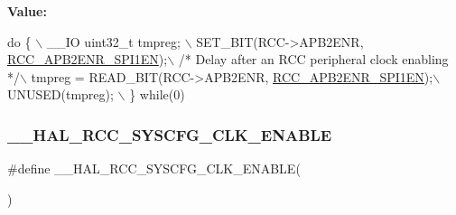 {\bfseries Value\+:}
\begin{DoxyCode}
\textcolor{keywordflow}{do} \{ \(\backslash\)
                                        \_\_IO uint32\_t tmpreg; \(\backslash\)
                                        SET\_BIT(RCC->APB2ENR, \hyperlink{group___peripheral___registers___bits___definition_gae08a3510371b9234eb96369c91d3552f}{RCC\_APB2ENR\_SPI1EN});\(\backslash\)
                                        \textcolor{comment}{/* Delay after an RCC peripheral clock enabling */}\(\backslash\)
                                        tmpreg = READ\_BIT(RCC->APB2ENR, 
      \hyperlink{group___peripheral___registers___bits___definition_gae08a3510371b9234eb96369c91d3552f}{RCC\_APB2ENR\_SPI1EN});\(\backslash\)
                                        UNUSED(tmpreg); \(\backslash\)
                                      \} \textcolor{keywordflow}{while}(0)
\end{DoxyCode}
\mbox{\label{group___r_c_c___a_p_b2___clock___enable___disable_gafc3ffcbb86e4913ae336ba094ca199e1}} 
\subsubsection{\texorpdfstring{\+\_\+\+\_\+\+H\+A\+L\+\_\+\+R\+C\+C\+\_\+\+S\+Y\+S\+C\+F\+G\+\_\+\+C\+L\+K\+\_\+\+E\+N\+A\+B\+LE}{\_\_HAL\_RCC\_SYSCFG\_CLK\_ENABLE}}
{\footnotesize\ttfamily \#define \+\_\+\+\_\+\+H\+A\+L\+\_\+\+R\+C\+C\+\_\+\+S\+Y\+S\+C\+F\+G\+\_\+\+C\+L\+K\+\_\+\+E\+N\+A\+B\+LE(\begin{DoxyParamCaption}{ }\end{DoxyParamCaption})}

